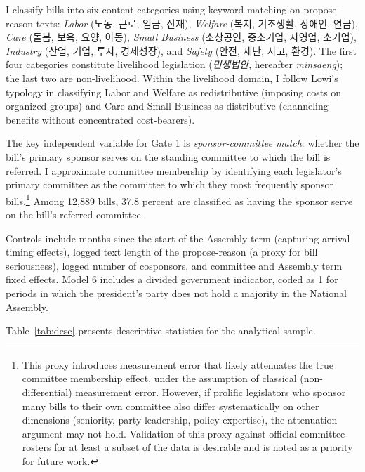 \documentclass[11pt]{article}
\begin{document}
I classify bills into six content categories using keyword matching on propose-reason texts: \emph{Labor} (노동, 근로, 임금, 산재), \emph{Welfare} (복지, 기초생활, 장애인, 연금), \emph{Care} (돌봄, 보육, 요양, 아동), \emph{Small Business} (소상공인, 중소기업, 자영업, 소기업), \emph{Industry} (산업, 기업, 투자, 경제성장), and \emph{Safety} (안전, 재난, 사고, 환경). The first four categories constitute livelihood legislation (\emph{민생법안}, hereafter \emph{minsaeng}); the last two are non-livelihood. Within the livelihood domain, I follow Lowi's typology in classifying Labor and Welfare as redistributive (imposing costs on organized groups) and Care and Small Business as distributive (channeling benefits without concentrated cost-bearers).

The key independent variable for Gate 1 is \emph{sponsor-committee match}: whether the bill's primary sponsor serves on the standing committee to which the bill is referred. I approximate committee membership by identifying each legislator's primary committee as the committee to which they most frequently sponsor bills.\footnote{This proxy introduces measurement error that likely attenuates the true committee membership effect, under the assumption of classical (non-differential) measurement error. However, if prolific legislators who sponsor many bills to their own committee also differ systematically on other dimensions (seniority, party leadership, policy expertise), the attenuation argument may not hold. Validation of this proxy against official committee rosters for at least a subset of the data is desirable and is noted as a priority for future work.} Among 12,889 bills, 37.8 percent are classified as having the sponsor serve on the bill's referred committee.

Controls include months since the start of the Assembly term (capturing arrival timing effects), logged text length of the propose-reason (a proxy for bill seriousness), logged number of cosponsors, and committee and Assembly term fixed effects. Model 6 includes a divided government indicator, coded as 1 for periods in which the president's party does not hold a majority in the National Assembly.

Table~\ref{tab:desc} presents descriptive statistics for the analytical sample.
\end{document}
